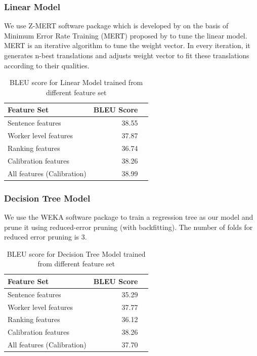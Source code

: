 \documentclass[11pt]{article}
\begin{document}
\subsubsection{Linear Model}
We use Z-MERT software package  which is developed by  on the basis of Minimum Error Rate Training (MERT) proposed by  to tune the linear model.  MERT is an iterative algorithm to tune the weight vector. In every iteration, it generates n-best translations and adjusts weight vector to fit these translations according to their qualities.

\begin{table}[htbp]
\begin{center}
\begin{tabular}{|l|rl|}
\hline \bf Feature Set & \bf BLEU Score &\\ \hline
Sentence features & 38.55 &\\
Worker level features & 37.87  &\\
Ranking features & 36.74 & \\
Calibration features & 38.26&\\
All features (Calibration) & 38.99 &\\
\hline
\end{tabular}
\end{center}
\caption{\label{tlmbleu} BLEU score for Linear Model trained from different feature set }
\end{table}

 \subsubsection{Decision Tree  Model}
 We use the WEKA software package \cite{hall2009weka} to train a regression tree as our model and prune it using reduced-error pruning (with backfitting). The number of folds for reduced error pruning is 3.   
 \begin{table}[htbp]
\begin{center}
\begin{tabular}{|l|rl|}
\hline \bf Feature Set & \bf BLEU Score &\\ \hline
Sentence features & 35.29 &\\
Worker level features & 37.77  &\\
Ranking features & 36.12& \\
Calibration features & 38.26&\\
All features (Calibration) & 37.70 & \\
\hline
\end{tabular}
\end{center}
\caption{\label{tdtbleu} BLEU score for Decision Tree Model trained from different feature set }
\end{table}
\end{document}
